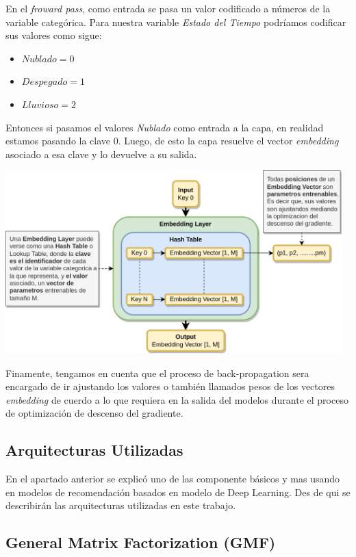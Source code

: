 \documentclass[11pt,a4paper,twoside]{thesis}
\begin{document}
En el \textit{froward pass}, como entrada se pasa un valor codificado a números de la variable categórica. Para nuestra variable \textit{Estado del Tiempo} podríamos codificar sus valores como sigue:

\begin{itemize}
	\item $Nublado    = 0$
	\item $Despegado  = 1$
	\item $Lluvioso   = 2$
\end{itemize}


Entonces si pasamos el valores \textit{Nublado} como entrada a la capa, en realidad estamos pasando la clave 0. Luego, de esto la capa resuelve el vector \textit{embedding} asociado a esa clave y lo devuelve a su salida.

\begin{center}
	\includegraphics[width=13cm]{./images/Embedding-Layer.png}
\end{center}

Finamente, tengamos en cuenta que el proceso de back-propagation sera encargado de ir ajustando los valores o también llamados pesos de los vectores \textit{embedding} de cuerdo a lo que requiera en la salida del modelos durante el proceso de optimización de descenso del gradiente. 


\subsection{Arquitecturas Utilizadas}

En el apartado anterior se explicó uno de las componente básicos y mas usando en modelos de recomendación basados en modelo de Deep Learning. Des de qui se describirán las arquitecturas utilizadas en este trabajo.

\subsection{General Matrix Factorization (GMF)}
\end{document}

